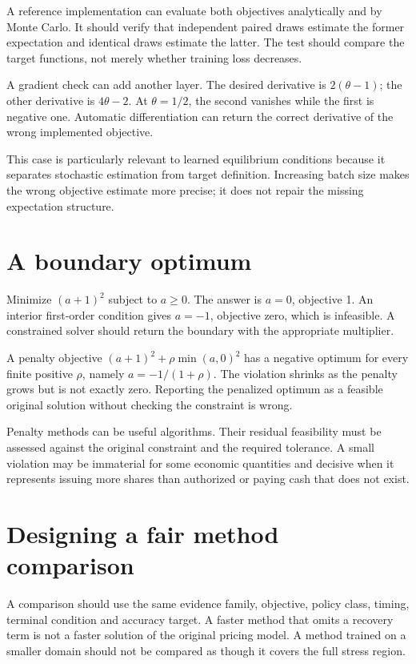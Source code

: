 A reference implementation can evaluate both objectives analytically and by Monte Carlo. It should verify that independent paired draws estimate the former expectation and identical draws estimate the latter. The test should compare the target functions, not merely whether training loss decreases.

A gradient check can add another layer. The desired derivative is $2(\theta-1)$; the other derivative is $4\theta-2$. At $\theta=1/2$, the second vanishes while the first is negative one. Automatic differentiation can return the correct derivative of the wrong implemented objective.

This case is particularly relevant to learned equilibrium conditions because it separates stochastic estimation from target definition. Increasing batch size makes the wrong objective estimate more precise; it does not repair the missing expectation structure.

\section{A boundary optimum}
Minimize $(a+1)^2$ subject to $a\geq0$. The answer is $a=0$, objective 1. An interior first-order condition gives $a=-1$, objective zero, which is infeasible. A constrained solver should return the boundary with the appropriate multiplier.

A penalty objective $(a+1)^2+\rho\min(a,0)^2$ has a negative optimum for every finite positive $\rho$, namely $a=-1/(1+\rho)$. The violation shrinks as the penalty grows but is not exactly zero. Reporting the penalized optimum as a feasible original solution without checking the constraint is wrong.

Penalty methods can be useful algorithms. Their residual feasibility must be assessed against the original constraint and the required tolerance. A small violation may be immaterial for some economic quantities and decisive when it represents issuing more shares than authorized or paying cash that does not exist.

\section{Designing a fair method comparison}
A comparison should use the same evidence family, objective, policy class, timing, terminal condition and accuracy target. A faster method that omits a recovery term is not a faster solution of the original pricing model. A method trained on a smaller domain should not be compared as though it covers the full stress region.

